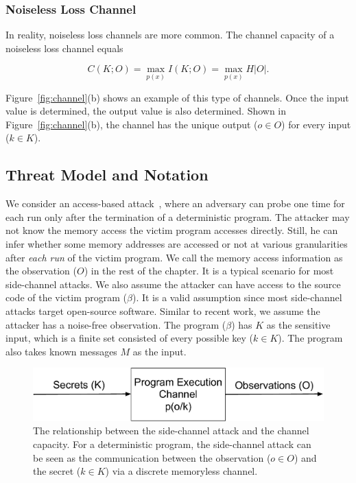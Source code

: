 \subsubsection{Noiseless Loss Channel}
In reality, noiseless loss channels are more common. The channel capacity of a noiseless loss channel equals

\begin{equation} \label{chapter:eq:5}
  C(K;O) = \max_{p(x)} I(K;O) = \max_{p(x)} H |O|.
\end{equation}

Figure~\ref{fig:channel}(b) shows an example of this type of channels. Once the input value is determined, the output value is also determined. Shown in Figure~\ref{fig:channel}(b), the channel has the unique output ($o \in O$) for every input ($k \in K$).


\subsection{Threat Model and Notation}


We consider an access-based attack~\cite{DBLP:journals/jce/GeYCH18}, where an adversary can probe one time for each run only after the termination of a deterministic program. The attacker may not know the memory access the victim program accesses directly. Still, he can infer whether some memory addresses are accessed or not at various granularities after \textit{each run} of the victim program. We call the memory access information as the observation ($O$) in the rest of the chapter. It is a typical scenario for most side-channel attacks.  We also assume the attacker can have access to the source code of the victim program ($\beta$). It is a valid assumption since most side-channel attacks target open-source software. Similar to recent work, we assume the attacker has a noise-free observation.  The program ($\beta$) has $K$ as the sensitive input, which is a finite set consisted of every possible key ($k \in K$). The program also takes known messages $M$ as the input. 

\begin{figure}[ht]
  \centering
  \includegraphics[width=.75\columnwidth]{./figures/chapter5/channel.pdf}
  \caption{The relationship between the side-channel attack and the channel capacity. For a deterministic program, the side-channel attack can be seen as the communication between the observation ($o \in O$) and the secret ($k \in K$) via a discrete memoryless channel.}
  \label{fig:side_channel}
\end{figure}

